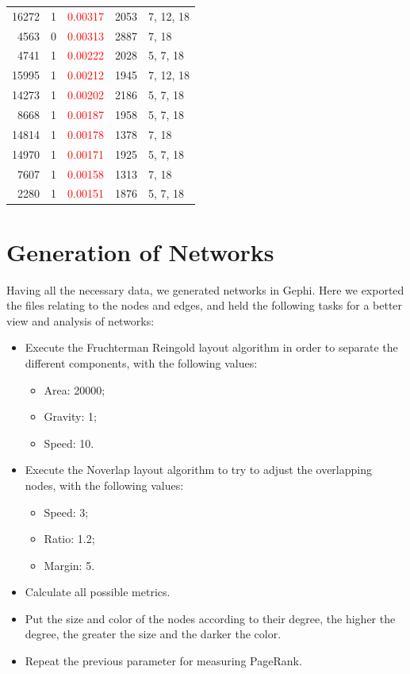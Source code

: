 \documentclass{article}
\begin{document}
\begin{multicols}{2}
\begin{table}[ht]
\begin{minipage}[b]{0.5\linewidth}
\begin{tabular}{r|rrrl}
16272 & 1 & \textcolor{red}{0.00317} & 2053 & 7, 12, 18 \\
4563 & 0 & \textcolor{red}{0.00313} & 2887 & 7, 18 \\
4741 & 1 & \textcolor{red}{0.00222} & 2028 & 5, 7, 18 \\
15995 & 1 & \textcolor{red}{0.00212} & 1945 & 7, 12, 18 \\
14273 & 1 & \textcolor{red}{0.00202} & 2186 & 5, 7, 18 \\
8668 & 1 & \textcolor{red}{0.00187} & 1958 & 5, 7, 18 \\
14814 & 1 & \textcolor{red}{0.00178} & 1378 & 7, 18 \\
14970 & 1 & \textcolor{red}{0.00171} & 1925 & 5, 7, 18 \\
7607 & 1 & \textcolor{red}{0.00158} & 1313 & 7, 18 \\
2280 & 1 & \textcolor{red}{0.00151} & 1876 & 5, 7, 18 \\    
\hline            
        \end{tabular}
    \end{minipage}
\end{table}



\section{Generation of Networks}
\label{section.generation}

Having all the necessary data, we generated networks in Gephi. Here we exported the files relating to the nodes and edges, and held the following tasks for a better view and analysis of networks:

\begin{itemize}
\item Execute the Fruchterman Reingold layout algorithm in order to separate the different components, with the following values:
\begin{itemize}
\item Area: 20000;
\item Gravity: 1;
\item Speed: 10.
\end{itemize}
\item Execute the Noverlap layout algorithm to try to adjust the overlapping nodes, with the following values:
\begin{itemize}
\item Speed: 3;
\item Ratio: 1.2;
\item Margin: 5.
\end{itemize}
\item Calculate all possible metrics.
\item Put the size and color of the nodes according to their degree, the higher the degree, the greater the size and the darker the color.
\item Repeat the previous parameter for measuring PageRank.
\end{itemize}


\end{multicols}
\end{document}
